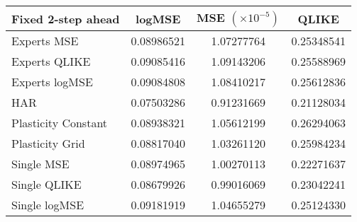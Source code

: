 
\begin{tabular}{l|c|c|c}
Fixed 2-step ahead     & logMSE & MSE $(\times 10^{-5})$ & QLIKE \\\hline
Experts MSE & 0.08986521 & 1.07277764 & 0.25348541\\ 
Experts QLIKE & 0.09085416 & 1.09143206 & 0.25588969\\ 
Experts logMSE & 0.09084808 & 1.08410217 & 0.25612836\\ 
HAR & 0.07503286 & 0.91231669 & 0.21128034\\ 
Plasticity Constant & 0.08938321 & 1.05612199 & 0.26294063\\ 
Plasticity Grid & 0.08817040 & 1.03261120 & 0.25984234\\ 
Single MSE & 0.08974965 & 1.00270113 & 0.22271637\\ 
Single QLIKE & 0.08679926 & 0.99016069 & 0.23042241\\ 
Single logMSE & 0.09181919 & 1.04655279 & 0.25124330\\ 
\end{tabular}